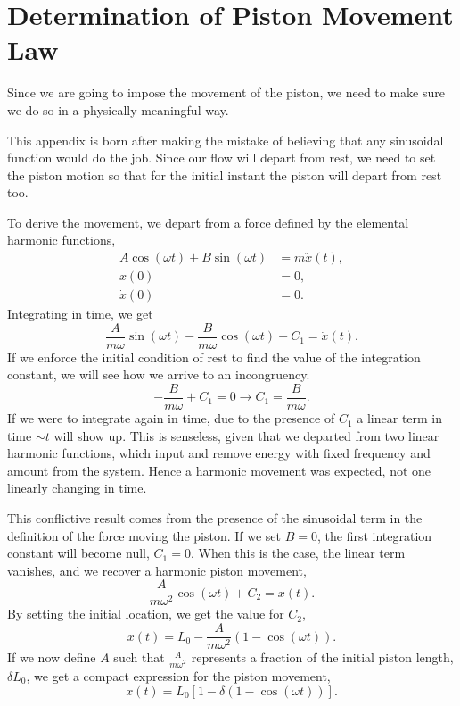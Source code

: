 \documentclass[../../thesis.tex]{subfiles}
\begin{document}
\section{Determination of Piston Movement Law}
Since we are going to impose the movement of the piston, we need to make sure 
we do so in a physically meaningful way.

This appendix is born after making the mistake of believing that any sinusoidal function would do the job.
Since our flow will depart from rest, 
we need to set the piston motion so that for the initial instant the piston will depart from rest too.

To derive the movement, we depart from a force defined by the elemental harmonic functions,
\begin{subequations}
\begin{align}
        A \cos(\omega t) + B \sin(\omega t) &= m \ddot{x}(t), 
        \\
        x(0) &= 0, 
        \\
        \dot{x}(0) &= 0.
\end{align}
\end{subequations}
Integrating in time, we get
\begin{equation}
    \frac{A}{m \omega} \sin(\omega t) - \frac{B}{m \omega} \cos(\omega t) + C_1 = \dot{x}(t).
\end{equation}
If we enforce the initial condition of rest to find the value of the integration constant, 
we will see how we arrive to an incongruency.
\begin{equation}
    - \frac{B}{m \omega} + C_1 = 0 \rightarrow C_1 = \frac{B}{m \omega}.
\end{equation}
If we were to integrate again in time, 
due to the presence of $C_1$ a linear term in time $\sim t$ will show up.
This is senseless, given that we departed from two linear harmonic functions, 
which input and remove energy with fixed frequency and amount from the system. 
Hence a harmonic movement was expected, not one linearly changing in time.

This conflictive result comes from the presence of the sinusoidal term in the definition of the force moving the piston.
If we set $B=0$, the first integration constant will become null, $C_1=0$. 
When this is the case, the linear term vanishes, and we recover a harmonic piston movement,
\begin{equation}
    \frac{A}{m \omega^2} \cos(\omega t) + C_2 = x(t).
\end{equation}
By setting the initial location, we get the value for $C_2$,
\begin{equation}
    x(t) = L_0 - \frac{A}{m \omega^2} \left(1 - \cos(\omega t)\right).
\end{equation}
If we now define $A$ such that $\frac{A}{m \omega^2}$ represents a fraction of the initial piston length, $\delta L_0$, 
we get a compact expression for the piston movement,
\begin{equation}
    x(t) = L_0\left[1 - \delta \left(1 - \cos(\omega t)\right)\right].
\end{equation}
\end{document}

